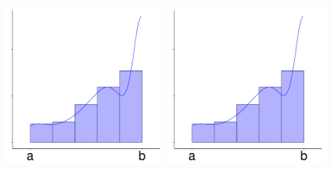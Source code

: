 \documentclass[a4paper]{report}
\begin{document}
\begin{center}
\newcommand{\blub}{0.45\textwidth}
\includegraphics[width=\blub,page=1]{int_graph3.pdf}
\includegraphics[width=\blub,page=2]{int_graph3.pdf}\\

\end{center}
\end{document}
